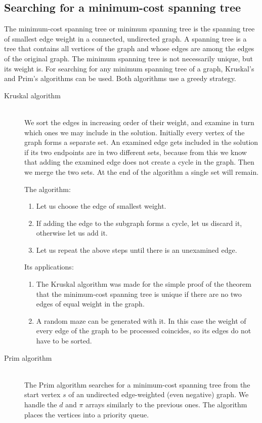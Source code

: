 \documentclass[margin=0px]{article}
\begin{document}
\subsection{Searching for a minimum-cost spanning tree}
The minimum-cost spanning tree or minimum spanning tree is the spanning tree of smallest edge weight in a connected, undirected graph. A spanning tree is a tree that contains all vertices of the graph and whose edges are among the edges of the original graph. The minimum spanning tree is not necessarily unique, but its weight is. For searching for any minimum spanning tree of a graph, Kruskal's and Prim's algorithms can be used. Both algorithms use a greedy strategy.
\begin{description}
	\item[Kruskal algorithm] \hfill \\
	   We sort the edges in increasing order of their weight, and examine in turn which ones we may include in the solution. Initially every vertex of the graph forms a separate set. An examined edge gets included in the solution if its two endpoints are in two different sets, because from this we know that adding the examined edge does not create a cycle in the graph. Then we merge the two sets. At the end of the algorithm a single set will remain.

	  The algorithm:
	  \begin{enumerate}
		 \item Let us choose the edge of smallest weight.
		 \item If adding the edge to the subgraph forms a cycle, let us discard it, otherwise let us add it.
		 \item Let us repeat the above steps until there is an unexamined edge.
	  \end{enumerate}
	  Its applications:
	  \begin{enumerate}
	  	 \item The Kruskal algorithm was made for the simple proof of the theorem that the minimum-cost spanning tree is unique if there are no two edges of equal weight in the graph.
	  	 \item A random maze can be generated with it. In this case the weight of every edge of the graph to be processed coincides, so its edges do not have to be sorted.
	  \end{enumerate}
	\item[Prim algorithm] \hfill \\
	The Prim algorithm searches for a minimum-cost spanning tree from the start vertex $s$ of an undirected edge-weighted (even negative) graph. We handle the $d$ and $\pi$ arrays similarly to the previous ones. The algorithm places the vertices into a priority queue.


\end{description}
\end{document}
